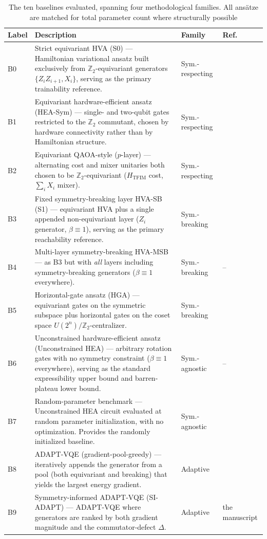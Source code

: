 \documentclass[pdflatex,sn-mathphys-num]{sn-jnl}
\theoremstyle{thmstyleone}
\theoremstyle{thmstyletwo}
\theoremstyle{thmstylethree}
\begin{document}
\begin{table}[t]
\centering
\caption{The ten baselines evaluated, spanning four methodological families. All ans\"atze are matched for total parameter count where structurally possible}
\label{tab:baselines}
\begin{tabular}{p{} p{} p{} p{}}
\hline\hline
\textbf{Label} & \textbf{Description} & \textbf{Family} & \textbf{Ref.} \\ \hline
B0 & Strict equivariant HVA (S0) --- Hamiltonian variational ansatz built exclusively from $\mathbb{Z}_2$-equivariant generators $\{Z_i Z_{i+1}, X_i\}$, serving as the primary trainability reference. & Sym.-respecting & \cite{nguyen2024theory} \\
B1 & Equivariant hardware-efficient ansatz (HEA-Sym) --- single- and two-qubit gates restricted to the $\mathbb{Z}_2$ commutant, chosen by hardware connectivity rather than by Hamiltonian structure. & Sym.-respecting & \cite{larocca2022group} \\
B2 & Equivariant QAOA-style ($p$-layer) --- alternating cost and mixer unitaries both chosen to be $\mathbb{Z}_2$-equivariant ($H_{\text{TFIM}}$ cost, $\sum_i X_i$ mixer). & Sym.-respecting & \cite{farhi2014quantum} \\
\hline
B3 & Fixed symmetry-breaking layer HVA-SB (S1) --- equivariant HVA plus a single appended non-equivariant layer ($Z_i$ generator, $\beta \equiv 1$), serving as the primary reachability reference. & Sym.-breaking & \cite{park2021symmetry,park2024symmetry} \\
B4 & Multi-layer symmetry-breaking HVA-MSB --- as B3 but with \textit{all} layers including symmetry-breaking generators ($\beta \equiv 1$ everywhere). & Sym.-breaking & -- \\
B5 & Horizontal-gate ansatz (HGA) --- equivariant gates on the symmetric subspace plus horizontal gates on the coset space $U(2^n)/\mathbb{Z}_2$-centralizer. & Sym.-breaking & \cite{wiersema2025geometric} \\
\hline
B6 & Unconstrained hardware-efficient ansatz (Unconstrained HEA) --- arbitrary rotation gates with no symmetry constraint ($\beta \equiv 1$ everywhere), serving as the standard expressibility upper bound and barren-plateau lower bound. & Sym.-agnostic & -- \\
B7 & Random-parameter benchmark --- Unconstrained HEA circuit evaluated at random parameter initialization, with no optimization. Provides the randomly initialized baseline. & Sym.-agnostic & \cite{mcclean2018barren} \\
\hline
B8 & ADAPT-VQE (gradient-pool-greedy) --- iteratively appends the generator from a pool (both equivariant and breaking) that yields the largest energy gradient. & Adaptive & \cite{grimsley2019adapt} \\
B9 & Symmetry-informed ADAPT-VQE (SI-ADAPT) --- ADAPT-VQE where generators are ranked by both gradient magnitude and the commutator-defect $\Delta$. & Adaptive & the manuscript \\
\hline\hline
\end{tabular}
\end{table}
\end{document}
